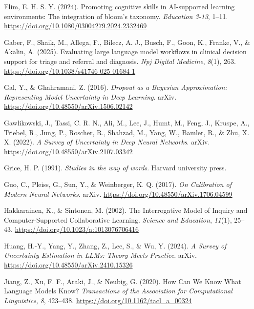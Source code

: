 \documentclass[
  12pt,
]{article}
\newlength{\cslhangindent}
\newenvironment{CSLReferences}[2] %
 {\begin{list}{}{%
  \setlength{\itemindent}{0pt}
  \setlength{\leftmargin}{0pt}
  \setlength{\parsep}{0pt}
  \ifodd #1
   \setlength{\leftmargin}{\cslhangindent}
   \setlength{\itemindent}{-1\cslhangindent}
  \fi
  \setlength{\itemsep}{#2\baselineskip}}}
 {\end{list}}
\begin{document}
\begin{CSLReferences}{1}{0}
Elim, E. H. S. Y. (2024). Promoting cognitive skills in {AI}-supported learning environments: The integration of bloom's taxonomy. \emph{Education 3-13}, 1--11. \url{https://doi.org/10.1080/03004279.2024.2332469}

Gaber, F., Shaik, M., Allega, F., Bilecz, A. J., Busch, F., Goon, K., Franke, V., \& Akalin, A. (2025). Evaluating large language model workflows in clinical decision support for triage and referral and diagnosis. \emph{Npj Digital Medicine}, \emph{8}(1), 263. \url{https://doi.org/10.1038/s41746-025-01684-1}

Gal, Y., \& Ghahramani, Z. (2016). \emph{Dropout as a {Bayesian} {Approximation}: {Representing} {Model} {Uncertainty} in {Deep} {Learning}}. arXiv. \url{https://doi.org/10.48550/arXiv.1506.02142}

Gawlikowski, J., Tassi, C. R. N., Ali, M., Lee, J., Humt, M., Feng, J., Kruspe, A., Triebel, R., Jung, P., Roscher, R., Shahzad, M., Yang, W., Bamler, R., \& Zhu, X. X. (2022). \emph{A {Survey} of {Uncertainty} in {Deep} {Neural} {Networks}}. arXiv. \url{https://doi.org/10.48550/arXiv.2107.03342}

Grice, H. P. (1991). \emph{Studies in the way of words}. Harvard university press.

Guo, C., Pleiss, G., Sun, Y., \& Weinberger, K. Q. (2017). \emph{On {Calibration} of {Modern} {Neural} {Networks}}. arXiv. \url{https://doi.org/10.48550/arXiv.1706.04599}

Hakkarainen, K., \& Sintonen, M. (2002). The {Interrogative} {Model} of {Inquiry} and {Computer}-{Supported} {Collaborative} {Learning}. \emph{Science and Education}, \emph{11}(1), 25--43. \url{https://doi.org/10.1023/a:1013076706416}

Huang, H.-Y., Yang, Y., Zhang, Z., Lee, S., \& Wu, Y. (2024). \emph{A {Survey} of {Uncertainty} {Estimation} in {LLMs}: {Theory} {Meets} {Practice}}. arXiv. \url{https://doi.org/10.48550/arXiv.2410.15326}

Jiang, Z., Xu, F. F., Araki, J., \& Neubig, G. (2020). How {Can} {We} {Know} {What} {Language} {Models} {Know}? \emph{Transactions of the Association for Computational Linguistics}, \emph{8}, 423--438. \url{https://doi.org/10.1162/tacl_a_00324}


\end{CSLReferences}
\end{document}
